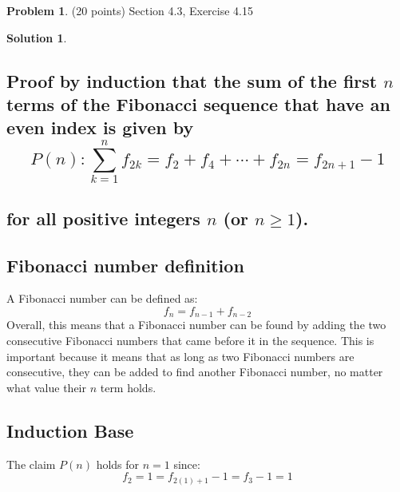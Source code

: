 \documentclass{article}
\theoremstyle{definition}
\newtheorem{problem}{Problem}
\newtheorem*{solution}{Solution}
\begin{document}
\newpage
\begin{problem} (20 points) Section 4.3, Exercise 4.15
\end{problem}
\begin{solution}
\hspace{1cm}
\subsection*{Proof by induction that the sum of the first $n$ terms of the Fibonacci sequence that have an even index is given by\\
$$P(n): \sum_{k=1}^{n} f_{2k} = f_2 + f_4 + \cdots + f_{2n} = f_{2n+1} - 1$$\\
for all positive integers $n$ (or $n \geqslant 1$).}
\subsection*{Fibonacci number definition}
A Fibonacci number can be defined as:
$$ f_n = f_{n-1} + f_{n-2}$$
Overall, this means that a Fibonacci number can be found by adding the two consecutive Fibonacci numbers that came before it in the sequence. This is important because it means that as long as two Fibonacci numbers are consecutive, they can be added to find another Fibonacci number, no matter what value their $n$ term holds.
\subsection*{Induction Base}
The claim $P(n)$ holds for $n = 1$ since:\\
$$ f_2 = 1 = f_{2(1) + 1} - 1 = f_3 - 1 = 1 $$

\end{solution}
\end{document}

